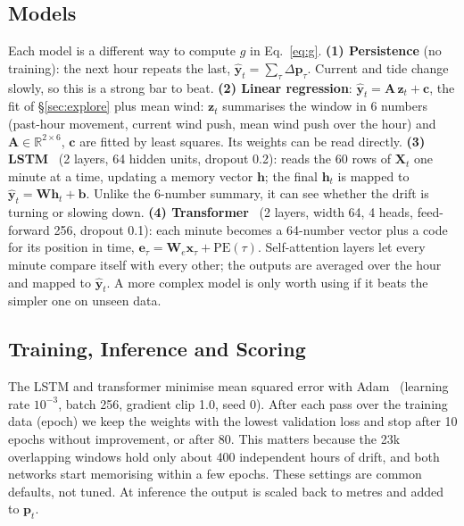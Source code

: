 \documentclass[sigconf]{acmart}
\begin{document}
\subsection{Models}
Each model is a different way to compute $g$ in Eq.~\ref{eq:g}.
\textbf{(1) Persistence} (no training): the next hour repeats the last, $\hat{\mathbf{y}}_t=\sum_{\tau}\Delta\mathbf{p}_\tau$. Current and tide change slowly, so this is a strong bar to beat.
\textbf{(2) Linear regression}: $\hat{\mathbf{y}}_t=\mathbf{A}\,\mathbf{z}_t+\mathbf{c}$, the fit of \S\ref{sec:explore} plus mean wind: $\mathbf{z}_t$ summarises the window in 6 numbers (past-hour movement, current wind push, mean wind push over the hour) and $\mathbf{A}\in\mathbb{R}^{2\times6}$, $\mathbf{c}$ are fitted by least squares. Its weights can be read directly.
\textbf{(3) LSTM}~\cite{hochreiter1997lstm} (2 layers, 64 hidden units, dropout 0.2): reads the 60 rows of $\mathbf{X}_t$ one minute at a time, updating a memory vector $\mathbf{h}$; the final $\mathbf{h}_t$ is mapped to $\hat{\mathbf{y}}_t=\mathbf{W}\mathbf{h}_t+\mathbf{b}$. Unlike the 6-number summary, it can see whether the drift is turning or slowing down.
\textbf{(4) Transformer}~\cite{vaswani2017attention} (2 layers, width 64, 4 heads, feed-forward 256, dropout 0.1): each minute becomes a 64-number vector plus a code for its position in time, $\mathbf{e}_\tau=\mathbf{W}_e\mathbf{x}_\tau+\mathrm{PE}(\tau)$. Self-attention layers let every minute compare itself with every other; the outputs are averaged over the hour and mapped to $\hat{\mathbf{y}}_t$. A more complex model is only worth using if it beats the simpler one on unseen data.

\subsection{Training, Inference and Scoring}
The LSTM and transformer minimise mean squared error with Adam~\cite{kingma2015adam} (learning rate $10^{-3}$, batch 256, gradient clip 1.0, seed 0). After each pass over the training data (epoch) we keep the weights with the lowest validation loss and stop after 10 epochs without improvement, or after 80. This matters because the 23k overlapping windows hold only about 400 independent hours of drift, and both networks start memorising within a few epochs. These settings are common defaults, not tuned. At inference the output is scaled back to metres and added to $\mathbf{p}_t$.
\end{document}

